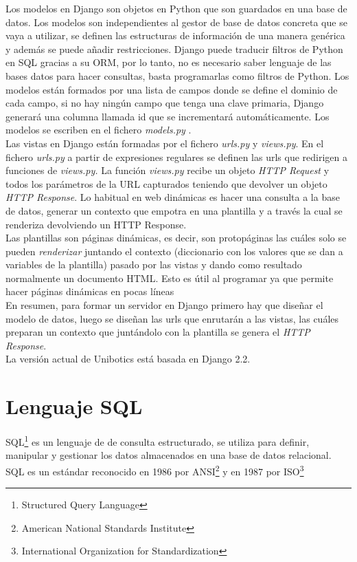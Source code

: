 Los modelos en Django son objetos en Python que son guardados en una base de datos. Los modelos son independientes al gestor de base de datos concreta que se vaya a utilizar, se definen las estructuras de información de una manera genérica y además se puede añadir restricciones. Django puede traducir filtros de Python en SQL gracias a su ORM, por lo tanto, no es necesario saber lenguaje de las bases datos para hacer consultas, basta programarlas como ﬁltros de
Python. Los modelos están formados por una lista de campos donde se define el dominio de cada campo, si no hay ningún campo que tenga una clave primaria, Django generará una columna llamada id que se incrementará automáticamente. Los modelos se escriben en el fichero \textit{models.py} \cite{model}.\\

Las vistas en Django están formadas por el fichero \textit{urls.py} y \textit{views.py}. En el fichero\textit{ urls.py} a partir de expresiones regulares se definen las urls que redirigen a funciones de \textit{views.py.} La función \textit{views.py} recibe un objeto \textit{HTTP Request} y todos los parámetros de la URL capturados teniendo que devolver un objeto \textit{HTTP Response}. Lo habitual en web dinámicas es hacer una consulta a la base de datos, generar un contexto que empotra en una plantilla y a través la cual se renderiza devolviendo un HTTP Response.\\

Las plantillas son páginas dinámicas, es decir, son protopáginas las cuáles solo se pueden \textit{renderizar} juntando el contexto (diccionario con los valores que se dan a variables de la plantilla) pasado por las vistas y dando como resultado normalmente un documento HTML. Esto es útil al programar ya que permite hacer páginas dinámicas en pocas líneas\\

En resumen, para formar un servidor en Django primero hay que diseñar el modelo de datos, luego se diseñan las urls que enrutarán a las vistas, las cuáles preparan un contexto que juntándolo con la plantilla se genera el \textit{HTTP Response}.\\

La versión actual de Unibotics está basada en Django 2.2.

\section{Lenguaje SQL}
SQL\footnote{Structured Query Language} es un lenguaje de de consulta estructurado, se utiliza para definir, manipular y gestionar los datos almacenados en una base de datos relacional. SQL es un estándar reconocido en 1986 por ANSI\footnote{American National Standards Institute} y en 1987 por ISO\footnote{International Organization for Standardization}\\

